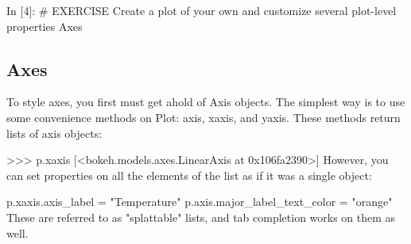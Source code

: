 In [4]:
# EXERCISE Create a plot of your own and customize several plot-level properties
Axes


\subsection{Axes}

To style axes, you first must get ahold of Axis objects. The simplest way is to use some convenience methods on Plot: axis, xaxis, and yaxis. These methods return lists of axis objects:

>>> p.xaxis
[<bokeh.models.axes.LinearAxis at 0x106fa2390>]
However, you can set properties on all the elements of the list as if it was a single object:

p.xaxis.axis_label = "Temperature"
p.axis.major_label_text_color = "orange"
These are referred to as "splattable" lists, and tab completion works on them as well.


